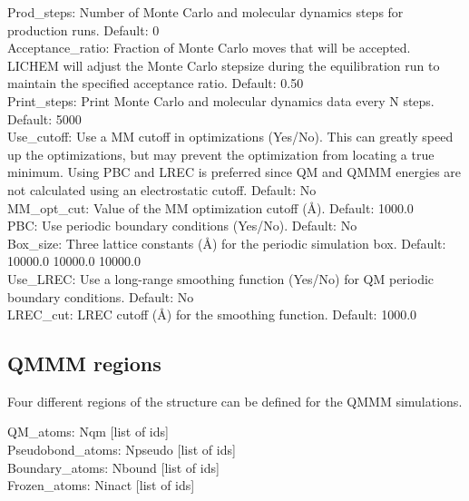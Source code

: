\documentclass[12pt]{report}
\begin{document}
Prod\_steps: Number of Monte Carlo and molecular dynamics steps for
production runs.
Default: 0 \\

Acceptance\_ratio: Fraction of Monte Carlo moves that will be accepted.
LICHEM will adjust the Monte Carlo stepsize during the equilibration run to
maintain the specified acceptance ratio.
Default: 0.50 \\

Print\_steps: Print Monte Carlo and molecular dynamics data every N steps.
Default: 5000 \\ 

Use\_cutoff: Use a MM cutoff in optimizations (Yes/No).
This can greatly speed up the optimizations, but may prevent the optimization
from locating a true minimum.
Using PBC and LREC is preferred since QM and QMMM energies are not calculated
using an electrostatic cutoff.
Default: No \\

MM\_opt\_cut: Value of the MM optimization cutoff (\AA).
Default: 1000.0 \\

PBC: Use periodic boundary conditions (Yes/No).
Default: No \\

Box\_size: Three lattice constants (\AA) for the periodic simulation box.
Default: 10000.0 10000.0 10000.0 \\

Use\_LREC: Use a long-range smoothing function (Yes/No) for QM periodic 
boundary conditions.
Default: No \\

LREC\_cut: LREC cutoff (\AA) for the smoothing function.
Default: 1000.0 \\

\subsection{QMMM regions}

Four different regions of the structure can be defined for the QMMM
simulations.

QM\_atoms: Nqm [list of ids] \\

Pseudobond\_atoms: Npseudo [list of ids] \\

Boundary\_atoms: Nbound [list of ids] \\

Frozen\_atoms: Ninact [list of ids] \\
\end{document}
